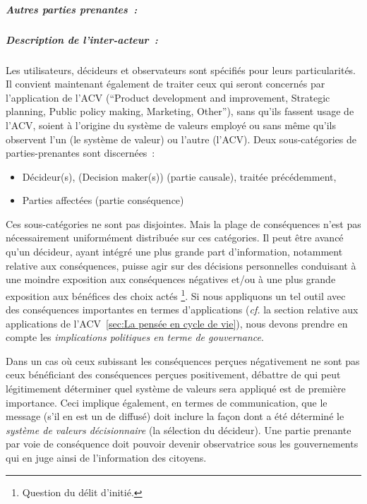\subparagraph{Autres parties prenantes~:}
 \subparagraph{Description de l'inter-acteur~:}
 
  Les utilisateurs, décideurs et observateurs sont spécifiés pour leurs particularités.
  Il convient maintenant également de traiter ceux qui seront concernés par l'application de l'\gls{ACV} (``Product development and improvement, Strategic planning, Public policy making, Marketing, Other''\cite[Figure 1 Framework for life cycle assessment (from ISO 14040:2006; modified)]{european_commission_ilcd_2010}), sans qu'ils fassent usage de l'\gls{ACV}, soient à l'origine du système de valeurs employé ou sans même  qu'ils observent l'un (le système de valeur) ou l'autre (l'\gls{ACV}).
  Deux sous-catégories de parties-prenantes sont discernées~:
  \begin{itemize}[noitemsep,topsep=0pt,parsep=0pt,partopsep=0pt]
   \item Décideur(s), (Decision maker(s)) (partie causale), traitée précédemment,
   \item Parties affectées (partie conséquence)
  \end{itemize}
  Ces sous-catégories ne sont pas disjointes.
  Mais la plage de conséquences n'est pas nécessairement uniformément distribuée sur ces catégories.
  Il peut être avancé qu'un décideur, ayant intégré une plus grande part d'information, notamment relative aux conséquences, puisse agir sur des décisions personnelles conduisant à une moindre exposition aux conséquences négatives et/ou à une plus grande exposition aux bénéfices des choix actés
  \footnote{Question du délit d'initié.}.
  Si nous appliquons un tel outil avec des conséquences importantes en termes d'applications (\textit{cf.} la section relative aux applications de l'\gls{ACV}~\ref{sec:La pensée en cycle de vie}), nous devons prendre en compte les \emph{implications politiques en terme de gouvernance}.
   
  Dans un cas où ceux subissant les conséquences perçues négativement ne sont pas ceux bénéficiant des conséquences perçues positivement, débattre de qui peut légitimement déterminer quel système de valeurs sera appliqué est de première importance.
  Ceci implique également, en termes de communication, que le message (s'il en est un de diffusé) doit inclure la façon dont a été déterminé le \emph{système de valeurs décisionnaire} (la sélection du décideur).
  Une partie prenante par voie de conséquence doit pouvoir devenir observatrice sous les gouvernements qui en juge ainsi de l'information des citoyens.
  
